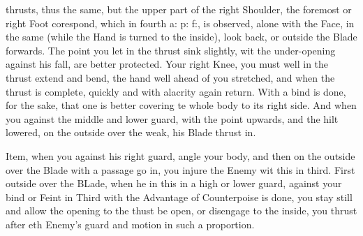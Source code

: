 \newpage


\newpage


thrusts, thus the same, but the upper part of the right Shoulder, the
foremost or right Foot corespond, which in fourth a: p: f:, is
observed, alone with the Face, in the same (while the Hand is turned
to the inside), look back, or outside the Blade forwards. The point
you let in the thrust sink slightly, wit the under-opening against his
fall, are better protected. Your right Knee, you must well in the
thrust extend and bend, the hand well ahead of you stretched, and when
the thrust is complete, quickly and with alacrity again return. With a
bind is done, for the sake, that one is better covering te whole body
to its right side. And when you against the middle and lower guard,
with the point upwards, and the hilt lowered, on the outside over the
weak, his Blade thrust in.


Item, when you against his right guard, angle your body, and then on
the outside over the Blade with a passage go in, you injure the Enemy
wit this in third. First outside over the BLade, when he in this in a
high or lower guard, against your bind or Feint in Third with the
Advantage of Counterpoise is done, you stay still and allow the
opening to the thust be open, or disengage to the inside, you thrust
after eth Enemy's guard and motion in such a proportion.

